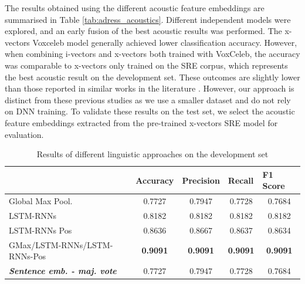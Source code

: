 The results obtained using the different acoustic feature embeddings are summarised in Table \ref{tab:adress_acoustics}. Different independent models were explored, and an early fusion of the best acoustic results was performed. The x-vectors Voxceleb model generally achieved lower classification accuracy. However, when combining i-vectors and x-vectors both trained with VoxCeleb, the accuracy was comparable to x-vectors only trained on the SRE corpus, which represents the best acoustic result on the development set. These outcomes are slightly lower than those reported in similar works in the literature \cite{warnita18_interspeech,zargarbashi2019multi}. However, our approach is distinct from these previous studies as we use a smaller dataset and do not rely on \ac{DNN} training. To validate these results on the test set, we select the acoustic feature embeddings extracted from the pre-trained x-vectors SRE model for evaluation.
\begin{table}[h]
  \begin{tabular}{lcccc}
  \hline
& \multicolumn{1}{l}{\textbf{Accuracy}} & \multicolumn{1}{l}{\textbf{Precision}} & \multicolumn{1}{l}{\textbf{Recall}} & \multicolumn{1}{l}{\textbf{F1 Score}} \\ \hline
  Global Max Pool. & 0.7727                               & 0.7947                                & 0.7728                             & 0.7684                               \\
  LSTM-RNNs        & 0.8182                               & 0.8182                                & 0.8182                             & 0.8182                               \\
  LSTM-RNNs Pos    & 0.8636                               & 0.8667                                & 0.8637                             & 0.8634                               \\
  GMax/LSTM-RNNs/LSTM-RNNs-Pos                   & \textbf{0.9091}                               & \textbf{0.9091}                                & \textbf{0.9091}                             & \textbf{0.9091}  \\  
  \textit{\textbf{Sentence emb. - maj. vote}}                    & 0.7727                               &0.7947                & 0.7728                           & 0.7684
  \\ \hline
  \end{tabular}
  \caption{Results of different linguistic approaches on the development set}
  \label{tab:res_dev_ling}
  \end{table}

